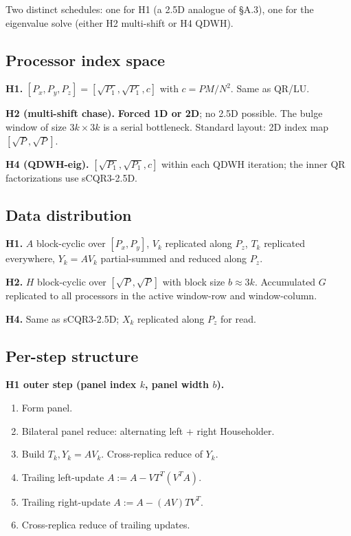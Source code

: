 \documentclass[11pt]{article}
\begin{document}
Two distinct schedules: one for H1 (a 2.5D analogue of \S A.3), one
for the eigenvalue solve (either H2 multi-shift or H4 QDWH).

\subsection{Processor index space}
\label{sec:B3a}

\textbf{H1.} $[P_x, P_y, P_z] = [\sqrt{P_1}, \sqrt{P_1}, c]$ with
$c = PM/N^2$. Same as QR/LU.

\textbf{H2 (multi-shift chase).} \textbf{Forced 1D or 2D}; no 2.5D
possible. The bulge window of size $3k \times 3k$ is a serial bottleneck.
Standard layout: 2D index map $[\sqrt{P}, \sqrt{P}]$.

\textbf{H4 (QDWH-eig).} $[\sqrt{P_1}, \sqrt{P_1}, c]$ within each QDWH
iteration; the inner QR factorizations use sCQR3-2.5D.

\subsection{Data distribution}
\label{sec:B3b}

\textbf{H1.} $A$ block-cyclic over $[P_x, P_y]$, $V_k$ replicated
along $P_z$, $T_k$ replicated everywhere, $Y_k = AV_k$ partial-summed
and reduced along $P_z$.

\textbf{H2.} $H$ block-cyclic over $[\sqrt{P}, \sqrt{P}]$ with block
size $b \approx 3k$. Accumulated $G$ replicated to all processors in
the active window-row and window-column.

\textbf{H4.} Same as sCQR3-2.5D; $X_k$ replicated along $P_z$ for
read.

\subsection{Per-step structure}
\label{sec:B3c}

\textbf{H1 outer step (panel index $k$, panel width $b$).}
\begin{enumerate}[leftmargin=2em]
  \item Form panel.
  \item Bilateral panel reduce: alternating left + right Householder.
  \item Build $T_k, Y_k = AV_k$. Cross-replica reduce of $Y_k$.
  \item Trailing left-update $A := A - V T^T (V^T A)$.
  \item Trailing right-update $A := A - (AV) T V^T$.
  \item Cross-replica reduce of trailing updates.
\end{enumerate}
\end{document}

